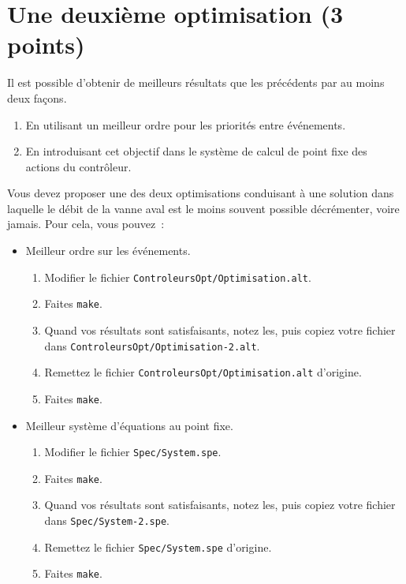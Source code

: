 \documentclass[a4paper]{book}
\begin{document}
\section{Une deuxième optimisation (3 points)}
Il est possible d'obtenir de meilleurs résultats que les précédents par au moins deux façons.
\begin{enumerate}
\item En utilisant un meilleur ordre pour les priorités entre événements.
\item En introduisant cet objectif dans le système de calcul de point fixe des actions du contrôleur.
\end{enumerate}

Vous devez proposer une des deux optimisations conduisant à une solution dans laquelle le débit de la vanne aval est le moins souvent possible décrémenter, voire jamais. Pour cela, vous pouvez~:
\begin{itemize}
\item Meilleur ordre sur les événements.
  \begin{enumerate}
  \item Modifier le fichier \texttt{ControleursOpt/Optimisation.alt}.
  \item Faites \texttt{make}.
  \item Quand vos résultats sont satisfaisants, notez les, puis copiez votre fichier dans \texttt{ControleursOpt/Optimisation-2.alt}.
  \item Remettez le fichier \texttt{ControleursOpt/Optimisation.alt} d'origine.
  \item Faites \texttt{make}.
  \end{enumerate}
\item Meilleur système d'équations au point fixe.
  \begin{enumerate}
  \item Modifier le fichier \texttt{Spec/System.spe}.
  \item Faites \texttt{make}.
  \item Quand vos résultats sont satisfaisants, notez les, puis copiez votre fichier dans \texttt{Spec/System-2.spe}.
  \item Remettez le fichier \texttt{Spec/System.spe} d'origine.
  \item Faites \texttt{make}.
  \end{enumerate}
\end{itemize}
\end{document}
